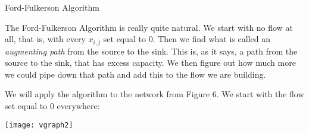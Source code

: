 \begin{frame}[fragile]{Ford-Fulkerson Algorithm}


The Ford-Fulkerson Algorithm is really quite natural.  We start with no flow at all, that is, with every $x_{i,j}$ set equal to $0$.  Then we find what is called an {\it augmenting path\/} from the source to the sink.  This is, as it says, a path from the source to the sink, that has excess capacity.  We then figure out how much more we could pipe down that path and add this to the flow we are building.

We will apply the algorithm to the network from Figure 6.  We start with the flow set equal to 0 everywhere:

\begin{center}
\texttt{[image: vgraph2]}
\end{center}



\end{frame}
